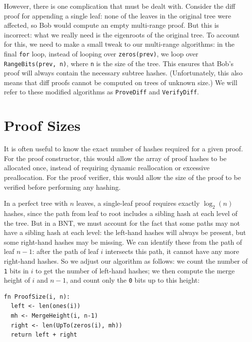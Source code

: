 \documentclass[twocolumn]{article}
\begin{document}
However, there is one complication that must be dealt with. Consider the diff proof for appending a single leaf: none of the leaves in the original tree were affected, so Bob would compute an empty multi-range proof. But this is incorrect: what we really need is the eigenroots of the original tree. To account for this, we need to make a small tweak to our multi-range algorithms: in the final \verb`for` loop, instead of looping over \verb`zeros(prev)`, we loop over \verb`RangeBits(prev, n)`, where \verb`n` is the size of the tree. This ensures that Bob's proof will always contain the necessary subtree hashes. (Unfortunately, this also means that diff proofs cannot be computed on trees of unknown size.) We will refer to these modified algorithms as \verb`ProveDiff` and \verb`VerifyDiff`.


\section{Proof Sizes}

It is often useful to know the exact number of hashes required for a given proof. For the proof constructor, this would allow the array of proof hashes to be allocated once, instead of requiring dynamic reallocation or excessive preallocation. For the proof verifier, this would allow the size of the proof to be verified before performing any hashing.

In a perfect tree with $n$ leaves, a single-leaf proof requires exactly $\log_2(n)$ hashes, since the path from leaf to root includes a sibling hash at each level of the tree. But in a BNT, we must account for the fact that some paths may not have a sibling hash at each level: the left-hand hashes will always be present, but some right-hand hashes may be missing. We can identify these from the path of leaf $n-1$: after the path of leaf $i$ intersects this path, it cannot have any more right-hand hashes. So we adjust our algorithm as follows: we count the number of \verb`1` bits in $i$ to get the number of left-hand hashes; we then compute the merge height of $i$ and $n-1$, and count only the \verb`0` bits up to this height:

\begin{minipage}[c]{0.95\textwidth}
\begin{lstlisting}
fn ProofSize(i, n):
  left <- len(ones(i))
  mh <- MergeHeight(i, n-1)
  right <- len(UpTo(zeros(i), mh))
  return left + right
\end{lstlisting}
\end{minipage}
\end{document}
